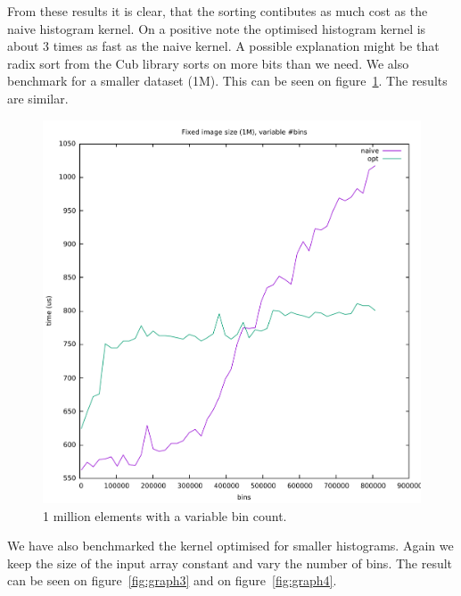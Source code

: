 \documentclass[12pt, a4paper, hidelinks]{article}
\begin{document}
From these results it is clear, that the sorting contibutes as much cost
as the naive histogram kernel.
On a positive note the optimised histogram kernel is about 3 times as
fast as the naive kernel.
A possible explanation might be that radix sort from the Cub library
sorts on more bits than we need.
We also benchmark for a smaller dataset (1M).
This can be seen on figure~\ref{fig:graph2}. The results are similar.

\begin{figure}[htpb]
    \centering
    \includegraphics[width=0.6\linewidth]{img/graphs/1M-varbins.pdf}
    \caption{1 million elements with a variable bin count.}
    \label{fig:graph2}
\end{figure}


We have also benchmarked the kernel optimised for smaller histograms. Again we keep the size of the input array constant and vary the number of bins. The result can be seen on figure~\ref{fig:graph3} and on figure~\ref{fig:graph4}. 
\end{document}
